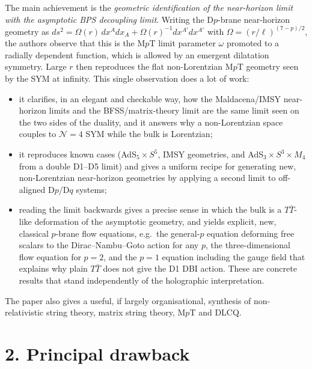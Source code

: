 \documentclass[11pt]{article}
\newcommand{\TT}{T\bar T}
\begin{document}
The main achievement is the \emph{geometric identification of the near-horizon limit with the asymptotic BPS decoupling limit}. Writing the D$p$-brane near-horizon geometry as
$ds^2=\mathbb{\Omega}(r)\,dx^A dx_A+\mathbb{\Omega}(r)^{-1}dx^{A'}dx^{A'}$ with $\mathbb{\Omega}=(r/\ell)^{(7-p)/2}$, the authors observe that this is the M$p$T limit parameter $\omega$ promoted to a radially dependent function, which is allowed by an emergent dilatation symmetry. Large $r$ then reproduces the flat non-Lorentzian M$p$T geometry seen by the SYM at infinity. This single observation does a lot of work:
\begin{itemize}[nosep]
\item it clarifies, in an elegant and checkable way, how the Maldacena/IMSY near-horizon limits and the BFSS/matrix-theory limit are the same limit seen on the two sides of the duality, and it answers why a non-Lorentzian space couples to $\mathcal N=4$ SYM while the bulk is Lorentzian;
\item it reproduces known cases (AdS$_5\times S^5$, IMSY geometries, and AdS$_3\times S^3\times M_4$ from a double D1--D5 limit) and gives a uniform recipe for generating new, non-Lorentzian near-horizon geometries by applying a second limit to off-aligned D$p$/D$q$ systems;
\item reading the limit backwards gives a precise sense in which the bulk is a $\TT$-like deformation of the asymptotic geometry, and yields explicit, new, classical $p$-brane flow equations, e.g.\ the general-$p$ equation deforming free scalars to the Dirac--Nambu--Goto action for any $p$, the three-dimensional flow equation for $p=2$, and the $p=1$ equation including the gauge field that explains why plain $\TT$ does not give the D1 DBI action. These are concrete results that stand independently of the holographic interpretation.
\end{itemize}
The paper also gives a useful, if largely organisational, synthesis of non-relativistic string theory, matrix string theory, M$p$T and DLCQ.

\section*{2. Principal drawback}
\end{document}
